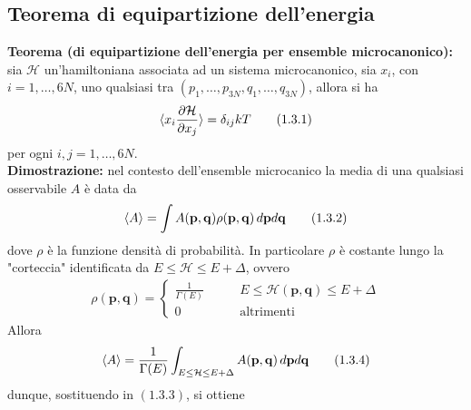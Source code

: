 \documentclass{article}
\begin{document}
\newpage
\subsection{Teorema di equipartizione dell'energia}
\textbf{Teorema (di equipartizione dell'energia per ensemble microcanonico):} sia $\mathcal{H}$ un'hamiltoniana associata ad un sistema microcanonico, sia $x_i$, con $i = 1, \dots, 6N$, uno qualsiasi tra $(p_1, \dots, p_{3N}, q_1, \dots, q_{3N})$, allora si ha 
\begin{align}
    \braket{x_i\frac{\partial \mathcal{H}}{\partial x_j}} = \delta_{ij}kT \tag{1.3.1}
\end{align}
per ogni $i, j = 1, \dots, 6N$. \\

\textbf{Dimostrazione:} nel contesto dell'ensemble microcanico la media di una qualsiasi osservabile $A$ è data da 
\begin{align}
    \braket{A} = \int A(\mathbf{p}, \mathbf{q})\rho(\mathbf{p}, \mathbf{q}) \, d\mathbf{p}d\mathbf{q} \tag{1.3.2}
\end{align}
dove $\rho$ è la funzione densità di probabilità. In particolare $\rho$ è costante lungo la "corteccia" identificata da $E \leq \mathcal{H} \leq E + \Delta$, ovvero 
\begin{align}
    \rho(\mathbf{p}, \mathbf{q}) = \begin{cases}
        \frac{1}{\Gamma(E)} \qquad &E \leq \mathcal{H}(\mathbf{p}, \mathbf{q}) \leq E + \Delta \\
        0 \qquad &\text{altrimenti}
    \end{cases} \tag{1.3.3}
\end{align}
Allora 
\begin{align}
    \braket{A} = \frac{1}{\Gamma(E)}\int_{E \leq \mathcal{H} \leq E + \Delta}A(\mathbf{p}, \mathbf{q}) \, d\mathbf{p}d\mathbf{q} \tag{1.3.4}
\end{align}
dunque, sostituendo in $(1.3.3)$, si ottiene
\end{document}
